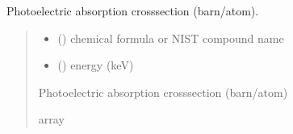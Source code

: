 \documentclass[letterpaper,10pt,english,openany,oneside]{sphinxmanual}
\begin{document}
\begin{fulllineitems}
\label{\detokenize{api/cross_sections:dxraylib.CSb_Photo_CP}}
\pysigstartsignatures
{}
\pysigstopsignatures
\sphinxAtStartPar
Photoelectric absorption cross\sphinxhyphen{}section (barn/atom).
\begin{quote}\begin{description}
\begin{itemize}
\item {} 
\sphinxAtStartPar
{} () \textendash{} chemical formula or NIST compound name

\item {} 
\sphinxAtStartPar
{} () \textendash{} energy (keV)

\end{itemize}

\sphinxAtStartPar
Photoelectric absorption cross\sphinxhyphen{}section (barn/atom)

\sphinxAtStartPar
array

\end{description}\end{quote}

\end{fulllineitems}


\begin{DUlineblock}{0em}
\item[] 
\end{DUlineblock}
\end{document}
